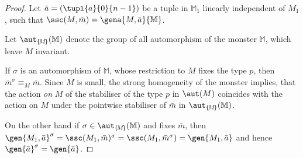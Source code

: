 \begin{proof}
Let $\bar a=(\tupl{a}{0}{n-1})$ be a tuple in $\mathbb{M}_{1}$ linearly independent of $M_{1}$, such that
$\ssc(M,\bar m)=\gena{M,\bar a}{\mathbb{M}}$.

\medskip
Let $\aut_{\{\!M\!\}}(\mathbb{M})$ denote the group of all automorphism of the monster $\mathbb{M}$,
which leave $M$ invariant.

If $\sigma$ is an automorphism of $\mathbb{M}$, whose restriction to ${M}$ fixes the type $p$,
then $\bar m^{\sigma}\equiv_{M}\bar m$.
%
Since $M$ is small, the strong homogeneity of the monster implies, that
the action {\em on} $M$ of the stabiliser of the type $p$ %
in $\aut(M)$ %
coincides with the action on $M$ %
under the pointwise stabiliser of %
$\bar m$ in $\aut_{\{\!M\!\}}(\mathbb{M})$. %

On the other hand if $\sigma\in\aut_{\{\!M\!\}}(\mathbb{M})$ and fixes $\bar m$, then $\gen{M_{1},\bar a}^{\sigma}=
\ssc(M_{1},\bar m)^{\sigma}=\ssc(M_{1},\bar m^{\sigma})=\gen{M_{1},\bar a}$ and hence $\gen{\bar a}^{\sigma}=\gen{\bar a}$.


\end{proof}
